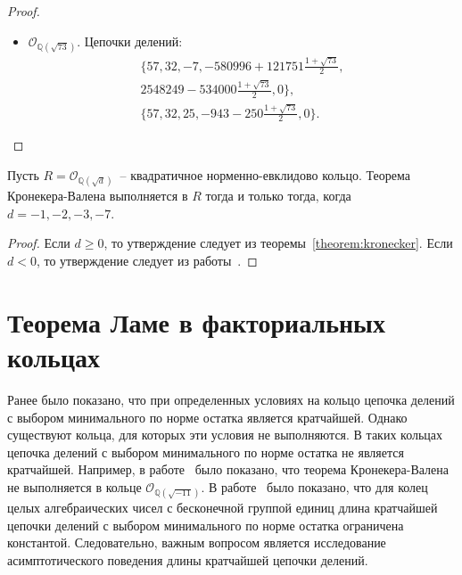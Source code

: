 \documentclass[_00_dissertation.tex]{subfiles}
\begin{document}
\begin{proof}
\begin{itemize}
        \item $\mathcal{O}_{\mathbb{Q}(\sqrt{73})}$.
        Цепочки делений:
        \begin{equation*}
            \begin{split}
                \{57, 32, -7, -580996+121751\frac{1+\sqrt{73}}{2},\\
                    2548249-534000\frac{1+\sqrt{73}}{2}, 0\},\\
                \{57, 32, 25, -943-250\frac{1+\sqrt{73}}{2}, 0\}.
            \end{split}
        \end{equation*}
    \end{itemize}
    
\end{proof}

\begin{corollary}
    Пусть $R = \mathcal{O}_{\mathbb{Q}(\sqrt{d})}$~-- квадратичное норменно-евклидово кольцо.
    Теорема Кронекера-Валена выполняется в $R$ тогда и только тогда, когда $d=-1, -2, -3, -7$.
\end{corollary}
\begin{proof}
    Если $d \ge 0$, то утверждение следует из теоремы~\ref{theorem:kronecker}.
    Если $d < 0$, то утверждение следует из работы~\cite[с.~322]{source:Rolletschek_1990}.
\end{proof}

\section{Теорема Ламе в факториальных кольцах}

Ранее было показано, что при определенных условиях на кольцо цепочка делений с выбором минимального по норме остатка является кратчайшей.
Однако существуют кольца, для которых эти условия не выполняются.
В таких кольцах цепочка делений с выбором минимального по норме остатка не является кратчайшей.
Например, в работе~\cite[с.~322]{source:Rolletschek_1990} было показано, что теорема Кронекера-Валена не выполняется в кольце $\mathcal{O}_{\mathbb{Q}(\sqrt{-11})}$.
В работе~\cite[с.~483]{source:Cooke} было показано, что для колец целых алгебраических чисел с бесконечной группой единиц длина кратчайшей цепочки делений с выбором минимального по норме остатка ограничена константой.
Следовательно, важным вопросом является исследование асимптотического поведения длины кратчайшей цепочки делений.
\end{document}
